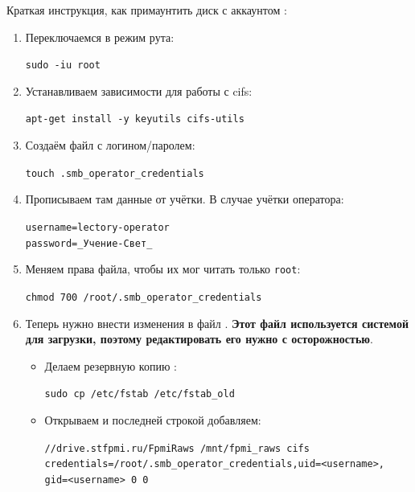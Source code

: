 Краткая инструкция, как примаунтить диск с аккаунтом :
\begin{enumerate}
  \item Переключаемся в режим рута:
        \begin{tcolorbox}
          \texttt{sudo -iu root}
        \end{tcolorbox}

  \item Устанавливаем зависимости для работы с cifs:
        \begin{tcolorbox}
          \texttt{apt-get install -y keyutils cifs-utils}
        \end{tcolorbox}

  \item Создаём файл с логином/паролем:
        \begin{tcolorbox}
          \texttt{touch .smb\_operator\_credentials}
        \end{tcolorbox}

  \item Прописываем там данные от учётки. В случае учётки оператора:
        \begin{tcolorbox}
          \texttt{username=lectory-operator} \\
          \texttt{password=\_Учение-Свет\_}
        \end{tcolorbox}

  \item Меняем права файла, чтобы их мог читать только \texttt{root}:
        \begin{tcolorbox}
          \texttt{chmod 700 /root/.smb\_operator\_credentials}
        \end{tcolorbox}

  \item Теперь нужно внести изменения в файл . \textbf{Этот файл используется системой для загрузки, поэтому редактировать его нужно с осторожностью}.
        \begin{itemize}
          \item Делаем резервную копию :
                \begin{tcolorbox}
                  \texttt{sudo cp /etc/fstab /etc/fstab\_old}
                \end{tcolorbox}

          \item Открываем  и последней строкой добавляем:
                \begin{tcolorbox}
                  {
                    \small\texttt{//drive.stfpmi.ru/FpmiRaws \qquad /mnt/fpmi\_raws \qquad cifs \qquad credentials=/root/.smb\_operator\_credentials,uid=<username>,
                      gid=<username> 0 0}
                  }
                \end{tcolorbox}


\end{itemize}
\end{enumerate}
